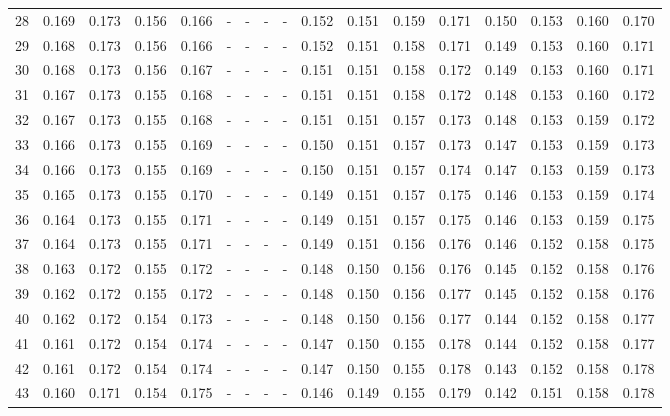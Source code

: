 \documentclass{report}
\begin{document}
\begin{appendices}
\begin{sidewaystable}
\begin{tabular}{|c|cccc|cccc|cccc|cccc|}
28 & 0.169 & 0.173 & 0.156 & 0.166 &   -   &   -   &   -   &   -   & 0.152 & 0.151 & 0.159 & 0.171 & 0.150 & 0.153 & 0.160 & 0.170\\
29 & 0.168 & 0.173 & 0.156 & 0.166 &   -   &   -   &   -   &   -   & 0.152 & 0.151 & 0.158 & 0.171 & 0.149 & 0.153 & 0.160 & 0.171\\
30 & 0.168 & 0.173 & 0.156 & 0.167 &   -   &   -   &   -   &   -   & 0.151 & 0.151 & 0.158 & 0.172 & 0.149 & 0.153 & 0.160 & 0.171\\
31 & 0.167 & 0.173 & 0.155 & 0.168 &   -   &   -   &   -   &   -   & 0.151 & 0.151 & 0.158 & 0.172 & 0.148 & 0.153 & 0.160 & 0.172\\
32 & 0.167 & 0.173 & 0.155 & 0.168 &   -   &   -   &   -   &   -   & 0.151 & 0.151 & 0.157 & 0.173 & 0.148 & 0.153 & 0.159 & 0.172\\
33 & 0.166 & 0.173 & 0.155 & 0.169 &   -   &   -   &   -   &   -   & 0.150 & 0.151 & 0.157 & 0.173 & 0.147 & 0.153 & 0.159 & 0.173\\
34 & 0.166 & 0.173 & 0.155 & 0.169 &   -   &   -   &   -   &   -   & 0.150 & 0.151 & 0.157 & 0.174 & 0.147 & 0.153 & 0.159 & 0.173\\
35 & 0.165 & 0.173 & 0.155 & 0.170 &   -   &   -   &   -   &   -   & 0.149 & 0.151 & 0.157 & 0.175 & 0.146 & 0.153 & 0.159 & 0.174\\
36 & 0.164 & 0.173 & 0.155 & 0.171 &   -   &   -   &   -   &   -   & 0.149 & 0.151 & 0.157 & 0.175 & 0.146 & 0.153 & 0.159 & 0.175\\
37 & 0.164 & 0.173 & 0.155 & 0.171 &   -   &   -   &   -   &   -   & 0.149 & 0.151 & 0.156 & 0.176 & 0.146 & 0.152 & 0.158 & 0.175\\
38 & 0.163 & 0.172 & 0.155 & 0.172 &   -   &   -   &   -   &   -   & 0.148 & 0.150 & 0.156 & 0.176 & 0.145 & 0.152 & 0.158 & 0.176\\
39 & 0.162 & 0.172 & 0.155 & 0.172 &   -   &   -   &   -   &   -   & 0.148 & 0.150 & 0.156 & 0.177 & 0.145 & 0.152 & 0.158 & 0.176\\
40 & 0.162 & 0.172 & 0.154 & 0.173 &   -   &   -   &   -   &   -   & 0.148 & 0.150 & 0.156 & 0.177 & 0.144 & 0.152 & 0.158 & 0.177\\
41 & 0.161 & 0.172 & 0.154 & 0.174 &   -   &   -   &   -   &   -   & 0.147 & 0.150 & 0.155 & 0.178 & 0.144 & 0.152 & 0.158 & 0.177\\
42 & 0.161 & 0.172 & 0.154 & 0.174 &   -   &   -   &   -   &   -   & 0.147 & 0.150 & 0.155 & 0.178 & 0.143 & 0.152 & 0.158 & 0.178\\
43 & 0.160 & 0.171 & 0.154 & 0.175 &   -   &   -   &   -   &   -   & 0.146 & 0.149 & 0.155 & 0.179 & 0.142 & 0.151 & 0.158 & 0.178\\

\end{tabular}
\end{sidewaystable}
\end{appendices}
\end{document}
